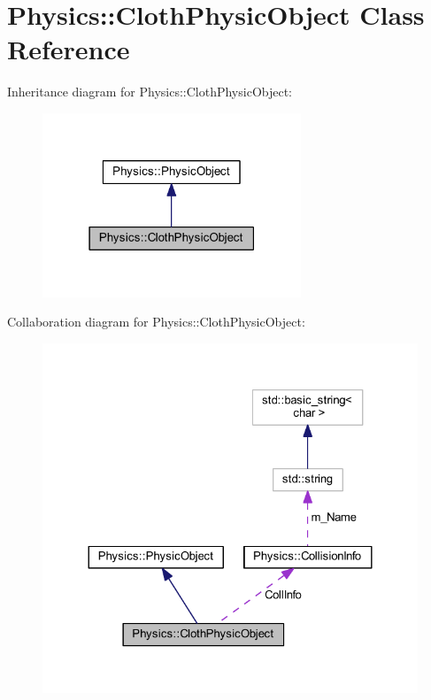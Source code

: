\hypertarget{class_physics_1_1_cloth_physic_object}{}\section{Physics\+:\+:Cloth\+Physic\+Object Class Reference}
\label{class_physics_1_1_cloth_physic_object}


Inheritance diagram for Physics\+:\+:Cloth\+Physic\+Object\+:
\nopagebreak
\begin{figure}[H]
\begin{center}
\leavevmode
\includegraphics[width=219pt]{class_physics_1_1_cloth_physic_object__inherit__graph}
\end{center}
\end{figure}


Collaboration diagram for Physics\+:\+:Cloth\+Physic\+Object\+:
\nopagebreak
\begin{figure}[H]
\begin{center}
\leavevmode
\includegraphics[width=324pt]{class_physics_1_1_cloth_physic_object__coll__graph}
\end{center}
\end{figure}

